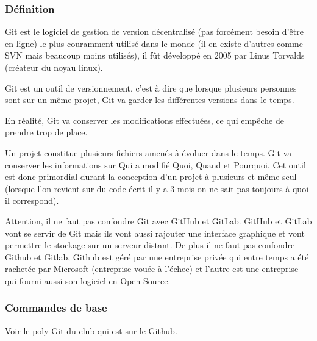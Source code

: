\subsubsection{Définition}

Git est le logiciel de gestion de version décentralisé (pas forcément besoin
d'être en ligne) le plus couramment utilisé dans le monde (il en existe d'autres
comme SVN mais beaucoup moins utilisés), il fût développé en 2005 par Linus
Torvalds (créateur du noyau linux).\newline

Git est un outil de versionnement, c'est à dire que lorsque plusieurs personnes
sont sur un même projet, Git va garder les différentes versions dans le temps.

En réalité, Git va conserver les modifications effectuées, ce qui empêche de
prendre trop de place.



Un projet constitue plusieurs fichiers amenés à évoluer dans le temps. Git va
conserver les informations sur Qui a modifié Quoi, Quand et Pourquoi.
Cet outil est donc primordial durant la conception d'un projet à plusieurs et
même seul (lorsque l'on revient sur du code écrit il y a 3 mois on ne sait pas
toujours à quoi il correspond).\newline


Attention, il ne faut pas confondre Git avec GitHub et GitLab. GitHub et GitLab
vont se servir de Git mais ils vont aussi rajouter une interface graphique et
vont permettre le stockage sur un serveur distant. De plus il ne faut pas
confondre Github et Gitlab, Github est géré par une entreprise privée qui entre
temps a été rachetée par Microsoft (entreprise vouée à l'échec) et l'autre est
une entreprise qui fourni aussi son logiciel en Open Source.

\subsubsection{Commandes de base}
Voir le poly Git du club qui est sur le Github.
